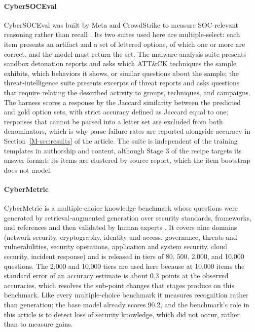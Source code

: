\documentclass[11pt,a4paper]{article}
\begin{document}
\paragraph{CyberSOCEval}
CyberSOCEval was built by Meta and CrowdStrike to measure SOC-relevant reasoning rather than recall \citep{deason2025cybersoceval}. Its two suites used here are multiple-select: each item presents an artifact and a set of lettered options, of which one or more are correct, and the model must return the set. The malware-analysis suite presents sandbox detonation reports and asks which ATT\&CK techniques the sample exhibits, which behaviors it shows, or similar questions about the sample; the threat-intelligence suite presents excerpts of threat reports and asks questions that require relating the described activity to groups, techniques, and campaigns. The harness scores a response by the Jaccard similarity between the predicted and gold option sets, with strict accuracy defined as Jaccard equal to one; responses that cannot be parsed into a letter set are excluded from both denominators, which is why parse-failure rates are reported alongside accuracy in Section~\ref{M-sec:results} of the article. The suite is independent of the training templates in authorship and content, although Stage 3 of the recipe targets its answer format; its items are clustered by source report, which the item bootstrap does not model.

\paragraph{CyberMetric}
CyberMetric is a multiple-choice knowledge benchmark whose questions were generated by retrieval-augmented generation over security standards, frameworks, and references and then validated by human experts \citep{tihanyi2024cybermetric}. It covers nine domains (network security, cryptography, identity and access, governance, threats and vulnerabilities, security operations, application and system security, cloud security, incident response) and is released in tiers of 80, 500, 2,000, and 10,000 questions. The 2,000 and 10,000 tiers are used here because at 10,000 items the standard error of an accuracy estimate is about 0.3 points at the observed accuracies, which resolves the sub-point changes that stages produce on this benchmark. Like every multiple-choice benchmark it measures recognition rather than generation; the base model already scores 90.2, and the benchmark's role in this article is to detect loss of security knowledge, which did not occur, rather than to measure gains.
\end{document}
